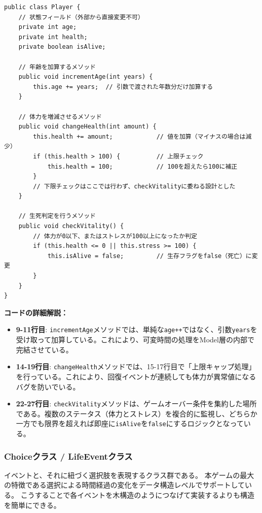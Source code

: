 \documentclass[a4paper,11pt]{jsarticle}
\begin{document}
\begin{lstlisting}[caption=Player.java（ステータス操作の抜粋）, label=code:player_detail]
public class Player {
    // 状態フィールド（外部から直接変更不可）
    private int age;
    private int health;
    private boolean isAlive;

    // 年齢を加算するメソッド
    public void incrementAge(int years) {
        this.age += years;  // 引数で渡された年数分だけ加算する
    }

    // 体力を増減させるメソッド
    public void changeHealth(int amount) {
        this.health += amount;            // 値を加算（マイナスの場合は減少）
        if (this.health > 100) {          // 上限チェック
            this.health = 100;            // 100を超えたら100に補正
        }
        // 下限チェックはここでは行わず、checkVitalityに委ねる設計とした
    }

    // 生死判定を行うメソッド
    public void checkVitality() {
        // 体力が0以下、またはストレスが100以上になったか判定
        if (this.health <= 0 || this.stress >= 100) {
            this.isAlive = false;         // 生存フラグをfalse（死亡）に変更
        }
    }
}
\end{lstlisting}

\textbf{コードの詳細解説：}
\begin{itemize}
    \item \textbf{9-11行目}: \texttt{incrementAge}メソッドでは、単純な\texttt{age++}ではなく、引数\texttt{years}を受け取って加算している。これにより、可変時間の処理をModel層の内部で完結させている。
    \item \textbf{14-19行目}: \texttt{changeHealth}メソッドでは、15-17行目で「上限キャップ処理」を行っている。これにより、回復イベントが連続しても体力が異常値になるバグを防いでいる。
    \item \textbf{22-27行目}: \texttt{checkVitality}メソッドは、ゲームオーバー条件を集約した場所である。複数のステータス（体力とストレス）を複合的に監視し、どちらか一方でも限界を超えれば即座に\texttt{isAlive}を\texttt{false}にするロジックとなっている。
\end{itemize}

\subsubsection{Choiceクラス / LifeEventクラス}
イベントと、それに紐づく選択肢を表現するクラス群である。
本ゲームの最大の特徴である選択による時間経過の変化をデータ構造レベルでサポートしている。
こうすることで各イベントを木構造のようにつなげて実装するよりも構造を簡単にできる。
\end{document}
